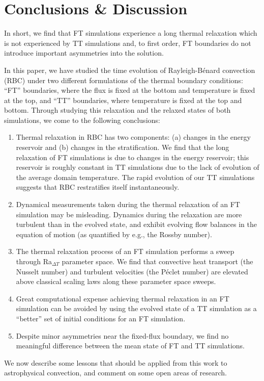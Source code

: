 \documentclass[aps, pre, onecolumn, nofootinbib, notitlepage, groupedaddress, amsfonts, amssymb, amsmath, longbibliography, superscriptaddress]{revtex4-1}
\newcommand{\RB}{Rayleigh-B\'{e}nard }
\begin{document}

\section{Conclusions \& Discussion}
\label{sec:discussion}
In short, we find that FT simulations experience a long thermal relaxation which is not experienced by TT simulations and, to first order, FT boundaries do not introduce important asymmetries into the solution.

In this paper, we have studied the time evolution of \RB convection (RBC) under two different formulations of the thermal boundary conditions: ``FT'' boundaries, where the flux is fixed at the bottom and temperature is fixed at the top, and ``TT'' boundaries, where temperature is fixed at the top and bottom.
Through studying this relaxation and the relaxed states of both simulations, we come to the following conclusions:
\begin{enumerate}
\item Thermal relaxation in RBC has two components: (a) changes in the energy reservoir and (b) changes in the stratification.
We find that the long relaxation of FT simulations is due to changes in the energy reservoir; this reservoir is roughly constant in TT simulations due to the lack of evolution of the average domain temperature.
The rapid evolution of our TT simulations suggests that RBC restratifies itself instantaneously.
\item Dynamical measurements taken during the thermal relaxation of an FT simulation may be misleading.
Dynamics during the relaxation are more turbulent than in the evolved state, and exhibit evolving flow balances in the equation of motion (as quantified by e.g., the Rossby number).
\item The thermal relaxation process of an FT simulation performs a sweep through Ra$_{\Delta T}$ parameter space.
We find that convective heat transport (the Nusselt number) and turbulent velocities (the P\'{e}clet number) are elevated above classical scaling laws along these parameter space sweeps.
\item Great computational expense achieving thermal relaxation in an FT simulation can be avoided by using the evolved state of a TT simulation as a ``better'' set of initial conditions for an FT simulation.
\item Despite minor asymmetries near the fixed-flux boundary, we find no meaningful difference between the mean state of FT and TT simulations.
\end{enumerate}
We now describe some lessons that should be applied from this work to astrophysical convection, and comment on some open areas of research.
\end{document}
